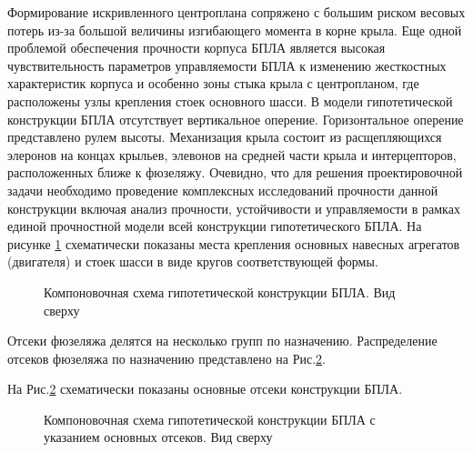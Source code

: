 Формирование искривленного центроплана сопряжено с большим риском весовых потерь из-за большой величины изгибающего момента в корне крыла. Еще одной проблемой обеспечения прочности корпуса БПЛА является высокая чувствительность параметров управляемости БПЛА к изменению жесткостных характеристик корпуса и особенно зоны стыка крыла с центропланом, где расположены узлы крепления стоек основного шасси. 
В модели гипотетической конструкции БПЛА отсутствует вертикальное оперение. Горизонтальное оперение представлено рулем высоты. Механизация крыла состоит из расщепляющихся элеронов на концах крыльев, элевонов на средней части крыла и интерцепторов, расположенных ближе к фюзеляжу. 
Очевидно, что для решения проектировочной задачи необходимо проведение комплексных исследований прочности данной конструкции включая анализ прочности, устойчивости и управляемости в рамках единой прочностной модели всей конструкции гипотетического БПЛА. 
На рисунке \ref{fig:BPS_Catia_Top_WithoutSkin} схематически показаны места крепления основных навесных агрегатов (двигателя) и стоек шасси в виде кругов соответствующей формы. 


\begin{figure}[H]
\centering
\def\svgwidth{0.9\textwidth}

\caption{Компоновочная схема гипотетической конструкции БПЛА. Вид сверху}
\label{fig:BPS_Catia_Top_WithoutSkin}
\end{figure}

Отсеки фюзеляжа делятся на несколько групп по назначению. Распределение отсеков фюзеляжа по назначению представлено на Рис.\ref{fig:BPS_Catia_Top_PartRoles}. 

На Рис.\ref{fig:BPS_Catia_Top_PartRoles} схематически показаны основные отсеки конструкции БПЛА. 

\begin{figure}[H]
\centering
\def\svgwidth{0.9\textwidth}

\caption{Компоновочная схема гипотетической конструкции БПЛА с указанием основных отсеков. Вид сверху}
\label{fig:BPS_Catia_Top_PartRoles}
\end{figure}
